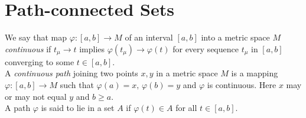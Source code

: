 \documentclass[../main-sheet.tex]{subfiles}
\begin{document}
\section{Path-connected Sets}
We say that map $ \varphi: [a,b]\to M $ of an interval $ [a,b] $ into a metric space $ M $ \emph{continuous} if $ t_\mu\to t $ implies $ \varphi(t_\mu)\to\varphi(t) $ for every sequence $ t_\mu $ in $ [a,b] $ converging to some $ t\in[a,b] $.\\

A \emph{continuous path} joining two points $ x,y $ in a metric space $ M $ is a mapping $ \varphi: [a,b]\to M $ such that $ \varphi(a)=x,\, \varphi(b)=y $ and $ \varphi $ is continuous. Here $ x $ may or may not equal $ y $ and $ b\geq a $.
\\

A path $ \varphi $ is said to lie in a set $ A $ if $ \varphi(t)\in A $ for all $ t\in [a,b] $.
\\
\end{document}
